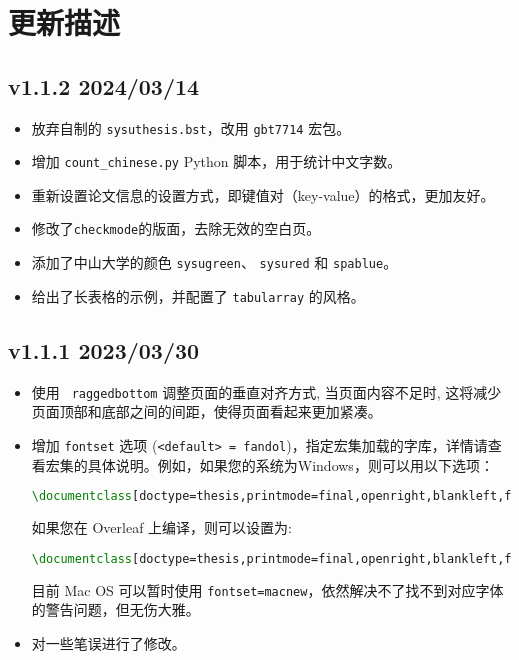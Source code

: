\chapter{更新描述}

\section*{v1.1.2 2024/03/14}
\begin{itemize}
    \item 放弃自制的 \texttt{sysuthesis.bst}，改用 \texttt{gbt7714} 宏包。
    \item 增加  \texttt{count\_chinese.py} Python 脚本，用于统计中文字数。
    \item 重新设置论文信息的设置方式，即键值对（key-value）的格式，更加友好。
    \item 修改了\texttt{checkmode}的版面，去除无效的空白页。
    \item 添加了中山大学的颜色 \texttt{sysugreen}、 \texttt{sysured} 和 \texttt{spablue}。
    \item 给出了长表格的示例，并配置了 \texttt{tabularray} 的风格。
\end{itemize}

\section*{v1.1.1 2023/03/30}
\begin{itemize}
    \item 使用 \texttt{ raggedbottom} 调整页面的垂直对齐方式, 当页面内容不足时, 这将减少页面顶部和底部之间的间距，使得页面看起来更加紧凑。
    \item 增加 \texttt{fontset} 选项 (\texttt{<default> = fandol})，指定\CTeX{}宏集加载的字库，详情请查看\CTeX{}宏集的具体说明。例如，如果您的系统为Windows，则可以用以下选项：
\begin{lstlisting}[language=TeX]
\documentclass[doctype=thesis,printmode=final,openright,blankleft,fontset=windows]{sysuthesis}
\end{lstlisting}
    如果您在 Overleaf 上编译，则可以设置为:
\begin{lstlisting}[language=TeX]
\documentclass[doctype=thesis,printmode=final,openright,blankleft,fontset=ubuntu]{sysuthesis}
\end{lstlisting}
    目前 Mac OS 可以暂时使用 \texttt{fontset=macnew}，依然解决不了找不到对应字体的警告问题，但无伤大雅。
    \item 对一些笔误进行了修改。
\end{itemize}

